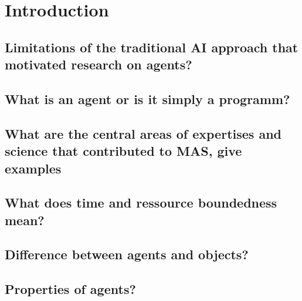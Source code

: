 \section{Introduction}
\subsection{Limitations of the traditional AI approach that motivated research on agents?}
\subsection{What is an agent or is it simply a programm?}
\subsection{What are the central areas of expertises and science that contributed to MAS, give examples}
\subsection{What does time and ressource boundedness mean?}
\subsection{Difference between agents and objects?}
\subsection{Properties of agents?}
